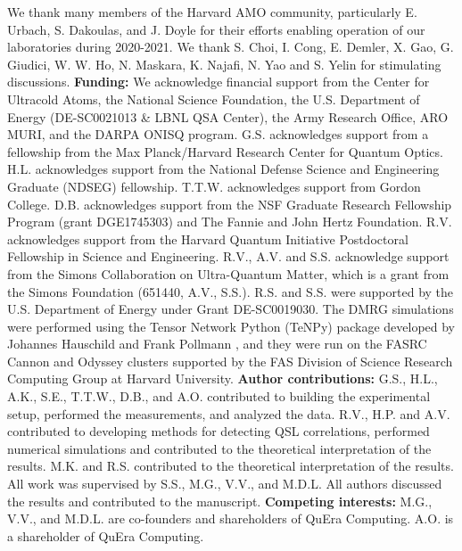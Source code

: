 \documentclass[twocolumn,amssymb,secnumarabic, prl, aps, nofootinbib]{revtex4-1}
\begin{document}
We thank many members of the Harvard AMO community, particularly E. Urbach, S. Dakoulas, and J. Doyle for their efforts enabling  operation of our laboratories during 2020-2021. We thank S. Choi, I. Cong, E. Demler, X. Gao, G. Giudici, W. W. Ho, N. Maskara, K. Najafi, N. Yao and S. Yelin for stimulating discussions. \textbf{Funding:} We acknowledge financial support from the Center for Ultracold Atoms, the National Science Foundation, the U.S. Department of Energy (DE-SC0021013 \& LBNL QSA Center), the Army Research Office, ARO MURI, and the DARPA ONISQ program. G.S. acknowledges support from a fellowship from the Max Planck/Harvard Research Center for Quantum Optics. H.L. acknowledges support from the National Defense Science and Engineering Graduate (NDSEG) fellowship. T.T.W. acknowledges support from Gordon College. D.B. acknowledges support from the NSF Graduate Research Fellowship Program (grant DGE1745303) and The Fannie and John Hertz Foundation. R.V. acknowledges support from the Harvard Quantum Initiative Postdoctoral Fellowship in Science and Engineering. R.V., A.V. and S.S. acknowledge support from the Simons Collaboration on Ultra-Quantum Matter, which is a grant from the Simons Foundation (651440, A.V., S.S.). R.S. and S.S. were supported by the U.S. Department of Energy under Grant DE-SC0019030. The DMRG simulations were performed using the Tensor Network Python (TeNPy) package developed by Johannes Hauschild and Frank Pollmann \cite{Hauschild18}, and they were run on the FASRC Cannon and Odyssey clusters supported by the FAS Division of Science Research Computing Group at Harvard University. \textbf{Author contributions:} G.S., H.L., A.K., S.E., T.T.W., D.B., and A.O. contributed to building the experimental setup, performed the measurements, and analyzed the data. R.V., H.P. and A.V. contributed to developing methods for detecting QSL correlations, performed numerical simulations and contributed to the theoretical interpretation of the results. M.K. and R.S. contributed to the theoretical interpretation of the results. All work was supervised by S.S., M.G., V.V., and M.D.L. All authors discussed the results and contributed to the manuscript. \textbf{Competing interests:} M.G., V.V., and M.D.L. are co-founders and shareholders of QuEra Computing. A.O. is a shareholder of QuEra Computing.


\let\oldaddcontentsline\addcontentsline%
\renewcommand{\addcontentsline}[3]{}%


\let\addcontentsline\oldaddcontentsline%
\end{document}
